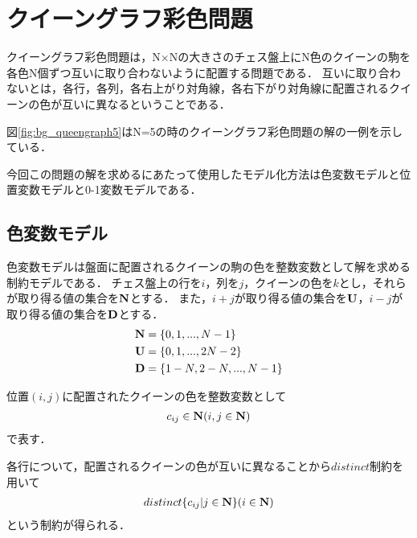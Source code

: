 \chapter{クイーングラフ彩色問題}\label{sec:bg}

クイーングラフ彩色問題は，N×Nの大きさのチェス盤上にN色のクイーンの駒を各色N個ずつ互いに取り合わないように配置する問題である．
互いに取り合わないとは，各行，各列，各右上がり対角線，各右下がり対角線に配置されるクイーンの色が互いに異なるということである．

\label{fig:bg_queengraph5}

図\ref{fig:bg_queengraph5}はN=5の時のクイーングラフ彩色問題の解の一例を示している．

今回この問題の解を求めるにあたって使用したモデル化方法は色変数モデルと位置変数モデルと0-1変数モデルである．


\section{色変数モデル}\label{sec:bg_col}
色変数モデルは盤面に配置されるクイーンの駒の色を整数変数として解を求める制約モデルである．
チェス盤上の行を$i$，列を$j$，クイーンの色を$k$とし，それらが取り得る値の集合を$\bf N$とする．
また，$i+j$が取り得る値の集合を$\bf U$，$i-j$が取り得る値の集合を$\bf D$とする．
\begin{eqnarray}
    {\bf N} & = \{0,1,...,N-1\} \nonumber \\
    {\bf U} & = \{0,1,...,2N-2\} \nonumber \\
    {\bf D} & = \{1-N,2-N,...,N-1\} \nonumber
\end{eqnarray}

位置$(i,j)$に配置されたクイーンの色を整数変数として
\begin{eqnarray}
    c_{ij} \in {\bf N} (i,j \in {\bf N}) \label{eq:bg_col_1}
\end{eqnarray}
で表す．

各行について，配置されるクイーンの色が互いに異なることから$distinct$制約を用いて
\begin{eqnarray}
    distinct\{c_{ij} | j \in {\bf N} \} (i \in {\bf N}) \label{eq:bg_col_2}
\end{eqnarray}
という制約が得られる．

